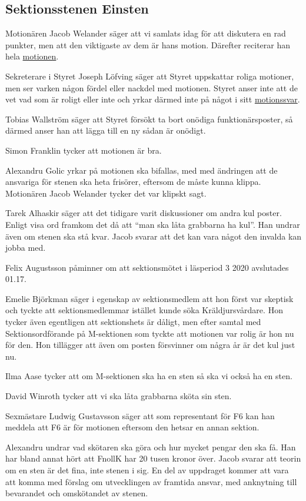 \documentclass[hidelinks]{sektionsmote} %
\begin{document}
\subsection{Sektionsstenen Einsten}
Motionären Jacob Welander säger att vi samlats idag för att diskutera en rad punkter, men att den viktigaste av dem är hans motion.
Därefter reciterar han hela \hyperlink{bilagor/motionfnollk.pdf.1}{motionen}.\par
Sekreterare i Styret Joseph Löfving säger att Styret uppskattar roliga motioner, men ser varken någon fördel eller nackdel med motionen.
Styret anser inte att de vet vad som är roligt eller inte och yrkar därmed inte på något i sitt \hyperlink{bilagor/motionfnollk.svar.pdf.1}{motionssvar}.\par
Tobias Wallström säger att Styret försökt ta bort onödiga funktionärsposter, så därmed anser han att lägga till en ny sådan är onödigt.\par
Simon Franklin tycker att motionen är bra.\par
Alexandru Golic yrkar på motionen ska bifallas, med med ändringen att de ansvariga för stenen ska heta frisörer, eftersom de måste kunna klippa.
Motionären Jacob Welander tycker det var klipskt sagt.\par
Tarek Alhaskir säger att det tidigare varit diskussioner om andra kul poster.
Enligt visa ord framkom det då att \enquote{man ska låta grabbarna ha kul}.
Han undrar även om stenen ska stå kvar.
Jacob svarar att det kan vara något den invalda kan jobba med.\par
Felix Augustsson påminner om att sektionsmötet i läsperiod 3 2020 avslutades 01.17.\par
Emelie Björkman säger i egenskap av sektionsmedlem att hon först var skeptisk och tyckte att sektionsmedlemmar istället kunde söka Kräldjursvårdare.
Hon tycker även egentligen att sektionshets är dåligt, men efter samtal med Sektionsordförande på M-sektionen som tyckte att motionen var rolig är hon nu för den.
Hon tillägger att även om posten försvinner om några år är det kul just nu.\par
Ilma Aase tycker att om M-sektionen ska ha en sten så ska vi också ha en sten.\par
David Winroth tycker att vi ska låta grabbarna sköta sin sten.\par
Sexmästare Ludwig Gustavsson säger att som representant för F6 kan han meddela att F6 är för motionen eftersom den hetsar en annan sektion.\par
Alexandru undrar vad skötaren ska göra och hur mycket pengar den ska få.
Han har bland annat hört att FnollK har 20 tusen kronor över.
Jacob svarar att teorin om en sten är det fina, inte stenen i sig.
En del av uppdraget kommer att vara att komma med förslag om utvecklingen av framtida ansvar, med anknytning till bevarandet och omskötandet av stenen.
\end{document}
